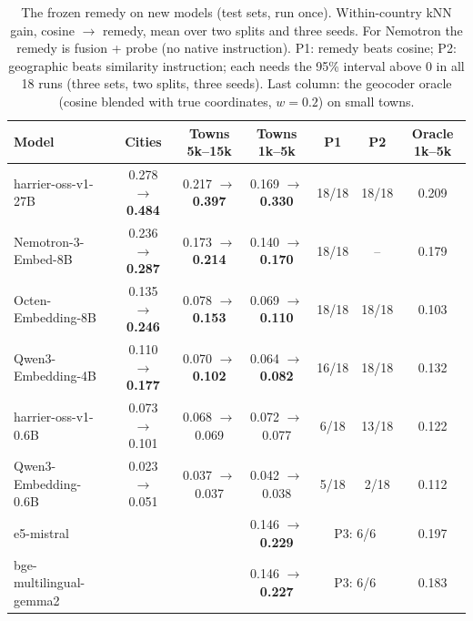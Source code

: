 \begin{table}[t]
\centering
\footnotesize
\setlength{\tabcolsep}{3.5pt}
\caption{The frozen remedy on new models (test sets, run once). Within-country kNN gain, cosine $\rightarrow$ remedy, mean over two splits and three seeds. For Nemotron the remedy is fusion + probe (no native instruction). P1: remedy beats cosine; P2: geographic beats similarity instruction; each needs the 95\% interval above 0 in all 18 runs (three sets, two splits, three seeds). Last column: the geocoder oracle (cosine blended with true coordinates, $w=0.2$) on small towns.}
\label{tab:more}
\begin{tabular}{@{}lcccccc@{}}
\toprule
Model & Cities & Towns 5k--15k & Towns 1k--5k & P1 & P2 & Oracle 1k--5k \\
\midrule
harrier-oss-v1-27B & 0.278 $\rightarrow$ \textbf{0.484} & 0.217 $\rightarrow$ \textbf{0.397} & 0.169 $\rightarrow$ \textbf{0.330} & 18/18 & 18/18 & 0.209 \\
Nemotron-3-Embed-8B & 0.236 $\rightarrow$ \textbf{0.287} & 0.173 $\rightarrow$ \textbf{0.214} & 0.140 $\rightarrow$ \textbf{0.170} & 18/18 & -- & 0.179 \\
Octen-Embedding-8B & 0.135 $\rightarrow$ \textbf{0.246} & 0.078 $\rightarrow$ \textbf{0.153} & 0.069 $\rightarrow$ \textbf{0.110} & 18/18 & 18/18 & 0.103 \\
Qwen3-Embedding-4B & 0.110 $\rightarrow$ \textbf{0.177} & 0.070 $\rightarrow$ \textbf{0.102} & 0.064 $\rightarrow$ \textbf{0.082} & 16/18 & 18/18 & 0.132 \\
harrier-oss-v1-0.6B & 0.073 $\rightarrow$ 0.101 & 0.068 $\rightarrow$ 0.069 & 0.072 $\rightarrow$ 0.077 & 6/18 & 13/18 & 0.122 \\
Qwen3-Embedding-0.6B & 0.023 $\rightarrow$ 0.051 & 0.037 $\rightarrow$ 0.037 & 0.042 $\rightarrow$ 0.038 & 5/18 & 2/18 & 0.112 \\
\midrule
e5-mistral & & & 0.146 $\rightarrow$ \textbf{0.229} & \multicolumn{2}{c}{P3: 6/6} & 0.197 \\
bge-multilingual-gemma2 & & & 0.146 $\rightarrow$ \textbf{0.227} & \multicolumn{2}{c}{P3: 6/6} & 0.183 \\
\bottomrule
\end{tabular}
\end{table}

